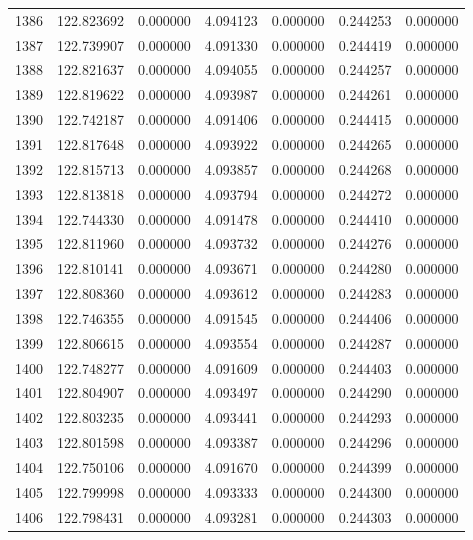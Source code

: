 \begin{tabular}{rrrrrrr}
1386 & 122.823692 &    0.000000 &  4.094123 &   0.000000 &   0.244253 &  0.000000 \\
1387 & 122.739907 &    0.000000 &  4.091330 &   0.000000 &   0.244419 &  0.000000 \\
1388 & 122.821637 &    0.000000 &  4.094055 &   0.000000 &   0.244257 &  0.000000 \\
1389 & 122.819622 &    0.000000 &  4.093987 &   0.000000 &   0.244261 &  0.000000 \\
1390 & 122.742187 &    0.000000 &  4.091406 &   0.000000 &   0.244415 &  0.000000 \\
1391 & 122.817648 &    0.000000 &  4.093922 &   0.000000 &   0.244265 &  0.000000 \\
1392 & 122.815713 &    0.000000 &  4.093857 &   0.000000 &   0.244268 &  0.000000 \\
1393 & 122.813818 &    0.000000 &  4.093794 &   0.000000 &   0.244272 &  0.000000 \\
1394 & 122.744330 &    0.000000 &  4.091478 &   0.000000 &   0.244410 &  0.000000 \\
1395 & 122.811960 &    0.000000 &  4.093732 &   0.000000 &   0.244276 &  0.000000 \\
1396 & 122.810141 &    0.000000 &  4.093671 &   0.000000 &   0.244280 &  0.000000 \\
1397 & 122.808360 &    0.000000 &  4.093612 &   0.000000 &   0.244283 &  0.000000 \\
1398 & 122.746355 &    0.000000 &  4.091545 &   0.000000 &   0.244406 &  0.000000 \\
1399 & 122.806615 &    0.000000 &  4.093554 &   0.000000 &   0.244287 &  0.000000 \\
1400 & 122.748277 &    0.000000 &  4.091609 &   0.000000 &   0.244403 &  0.000000 \\
1401 & 122.804907 &    0.000000 &  4.093497 &   0.000000 &   0.244290 &  0.000000 \\
1402 & 122.803235 &    0.000000 &  4.093441 &   0.000000 &   0.244293 &  0.000000 \\
1403 & 122.801598 &    0.000000 &  4.093387 &   0.000000 &   0.244296 &  0.000000 \\
1404 & 122.750106 &    0.000000 &  4.091670 &   0.000000 &   0.244399 &  0.000000 \\
1405 & 122.799998 &    0.000000 &  4.093333 &   0.000000 &   0.244300 &  0.000000 \\
1406 & 122.798431 &    0.000000 &  4.093281 &   0.000000 &   0.244303 &  0.000000 \\

\end{tabular}
